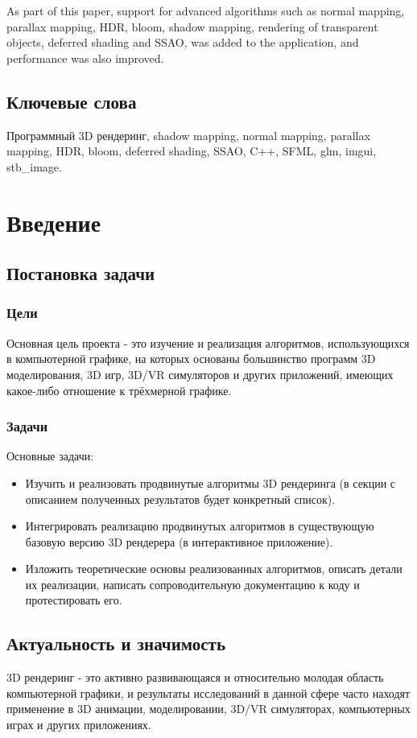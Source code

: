 \documentclass[14pt]{extarticle}
\begin{document}
As part of this paper, support for advanced algorithms such as normal mapping, parallax mapping, HDR, bloom, shadow mapping, rendering of transparent objects, deferred shading and SSAO, was added to the application, and performance was also improved.

\subsection{Ключевые слова}
Программный 3D рендеринг, shadow mapping, normal mapping, parallax mapping, HDR, bloom, deferred shading, SSAO, C++, SFML, glm, imgui, stb\_image.

\section{Введение}

\subsection{Постановка задачи}
\subsubsection{Цели}
Основная цель проекта - это изучение и реализация алгоритмов, использующихся в компьютерной графике, на которых основаны большинство программ 3D моделирования, 3D игр, 3D/VR симуляторов и других приложений, имеющих какое-либо отношение к трёхмерной графике. 
\subsubsection{Задачи}
Основные задачи:
\begin{itemize}
	\item Изучить и реализовать продвинутые алгоритмы 3D рендеринга (в секции с описанием полученных результатов будет конкретный список).
	\item Интегрировать реализацию продвинутых алгоритмов в существующую базовую версию 3D рендерера (в интерактивное приложение).
	\item Изложить теоретические основы реализованных алгоритмов, описать детали их реализации, написать сопроводительную документацию к коду и протестировать его.
\end{itemize}

\subsection{Актуальность и значимость}
3D рендеринг - это активно развивающаяся и относительно молодая область компьютерной графики, и результаты исследований в данной сфере часто находят применение в 3D анимации, моделировании, 3D/VR симуляторах, компьютерных играх и других приложениях.
\end{document}
